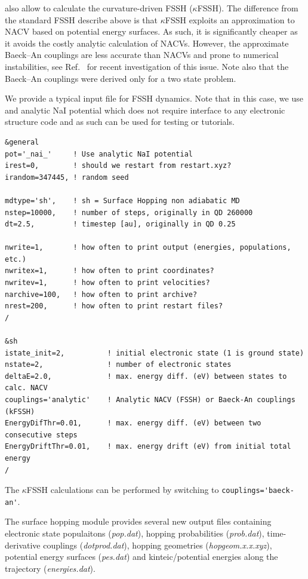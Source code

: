 \abin also allow to calculate the curvature-driven FSSH ($\kappa$FSSH)\cite{Jira2025}. The difference from the standard FSSH describe above is that $\kappa$FSSH exploits an approximation to NACV based on potential energy surfaces. As such, it is significantly cheaper as it avoids the costly analytic calculation of NACVs. However, the approximate Baeck--An couplings are less accurate than NACVs and prone to numerical instabilities, see Ref.~ for recent investigation of this issue. Note also that the Baeck--An couplings were derived only for a two state problem.

We provide a typical input file for FSSH dynamics. Note that in this case, we use and analytic NaI potential which does not require interface to any electronic structure code and as such can be used for testing or tutorials.
\begin{verbatim}
&general
pot='_nai_'     ! Use analytic NaI potential
irest=0,        ! should we restart from restart.xyz?
irandom=347445, ! random seed

mdtype='sh',    ! sh = Surface Hopping non adiabatic MD
nstep=10000,    ! number of steps, originally in QD 260000
dt=2.5,         ! timestep [au], originally in QD 0.25

nwrite=1,       ! how often to print output (energies, populations, etc.)
nwritex=1,      ! how often to print coordinates?
nwritev=1,      ! how often to print velocities?
narchive=100,   ! how often to print archive?
nrest=200,      ! how often to print restart files?
/

&sh
istate_init=2,          ! initial electronic state (1 is ground state)
nstate=2,               ! number of electronic states
deltaE=2.0,             ! max. energy diff. (eV) between states to calc. NACV
couplings='analytic'    ! Analytic NACV (FSSH) or Baeck-An couplings (kFSSH)
EnergyDifThr=0.01,      ! max. energy diff. (eV) between two consecutive steps
EnergyDriftThr=0.01,    ! max. energy drift (eV) from initial total energy
/
\end{verbatim}
The $\kappa$FSSH calculations can be performed by switching to \verb|couplings='baeck-an'|.

The surface hopping module provides several new output files containing electronic state populaitons (\textit{pop.dat}), hopping probabilities (\textit{prob.dat}), time-derivative couplings (\textit{dotprod.dat}), hopping geometries (\textit{hopgeom.x.x.xyz}), potential energy surfaces (\textit{pes.dat}) and kinteic/potential energies along the trajectory (\textit{energies.dat}).


